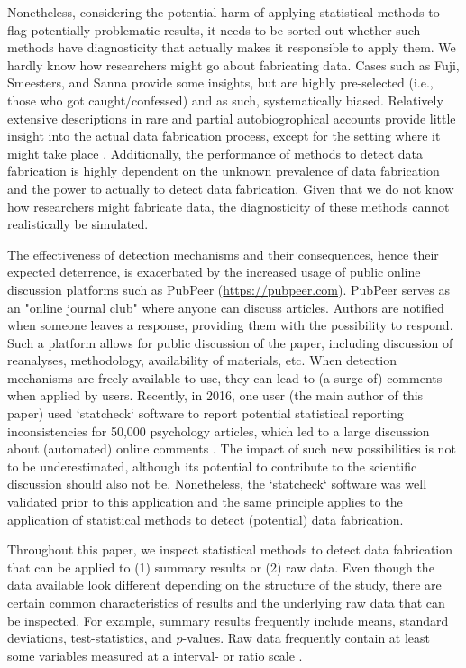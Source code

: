 \documentclass{article}
\begin{document}
Nonetheless, considering the potential harm of applying statistical methods to flag potentially problematic results, it needs to be sorted out whether such methods have diagnosticity that actually makes it responsible to apply them. We hardly know how researchers might go about fabricating data. Cases such as Fuji, Smeesters, and Sanna provide some insights, but are highly pre-selected (i.e., those who got caught/confessed) and as such, systematically biased. Relatively extensive descriptions in rare and partial autobiogrophical accounts provide little insight into the actual data fabrication process, except for the setting where it might take place \citep[e.g., late at night when no one is around;][]{stapel_book}. Additionally, the performance of methods to detect data fabrication is highly dependent on the unknown  prevalence of data fabrication and the power to actually to detect data fabrication. Given that we do not know how researchers might fabricate data, the diagnosticity of these methods cannot realistically be simulated.

The effectiveness of detection mechanisms and their consequences, hence their expected deterrence, is exacerbated by the increased usage of public online discussion platforms such as PubPeer (\url{https://pubpeer.com}). PubPeer serves as an "online journal club" where anyone can discuss articles. Authors are notified when someone leaves a response, providing them with the possibility to respond. Such a platform allows for public discussion of the paper, including discussion of reanalyses, methodology, availability of materials, etc. When detection mechanisms are freely available to use, they can lead to (a surge of) comments when applied by users. Recently, in 2016, one user (the main author of this paper) used `statcheck` software to report potential statistical reporting inconsistencies for 50,000 psychology articles, which led to a large discussion about (automated) online comments \citep{Baker_2016}. The impact of such new possibilities is not to be underestimated, although its potential to contribute to the scientific discussion should also not be. Nonetheless, the `statcheck` software was well validated prior to this application \citep{Nuijten_2015} and the same principle applies to the application of statistical methods to detect (potential) data fabrication.

Throughout this paper, we inspect statistical methods to detect data fabrication that can be applied to (1) summary results or (2) raw data. Even though the data available look different depending on the structure of the study, there are certain common characteristics of results and the underlying raw data that can be inspected. For example, summary results frequently include means, standard deviations, test-statistics, and $p$-values. Raw data frequently contain at least some variables measured at a interval- or ratio scale \citep{Stevens_1946}.
\end{document}
